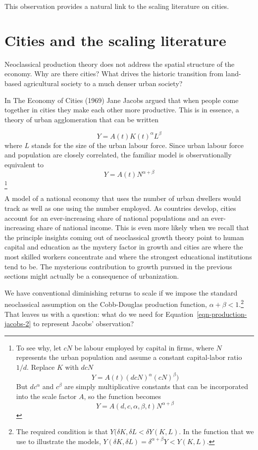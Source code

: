 This observation provides a natural link to the scaling literature on cities.


\section{Cities and the scaling literature}
Neoclassical production theory does not address the spatial structure of the economy. Why are there cities? What drives the historic transition from land-based agricultural society to a much denser urban society? 

In The Economy of Cities (1969) Jane Jacobs argued that when people come together in cities they make each other more productive. This is in essence, a theory of urban agglomeration that can be written

\begin{equation}
Y = A(t) K(t)^\alpha L^\beta 
\label{eqn-production-jacobs}
\end{equation}
where $L$ stands for the size of the urban labour force. Since urban labour force and population are closely correlated, the familiar model is observationally equivalent to
\begin{equation}
Y = A(t)N^{\alpha+\beta}
\label{eqn-production-jacobs-2}
\end{equation}
\footnote{ To see why, let  $cN$ be labour employed by capital in firms, where $N$ represents the urban population and assume a constant capital-labor ratio $1/d$. Replace $K$ with $dcN$
\[Y = A(t) (dcN)^\alpha (cN)^\beta) \]
But  $dc^\alpha$ and $c^\beta$ are simply multiplicative constants that can be incorporated into the scale factor $A$, so the function becomes 
\[Y = A(d, c,\alpha, \beta, t)N^{\alpha+\beta}\]
}

A model of a national economy that uses the number of urban dwellers would track as well as one using the number employed. As countries develop, cities account for an ever-increasing share of  national populations and an ever-increasing share of national income.  This is  even more likely when we recall that the principle insights coming out of neoclassical growth theory point to human capital and education as the mystery factor in growth and cities are where the most skilled workers concentrate and where the strongest educational institutions tend to be. The mysterious contribution to growth pursued in the previous sections might  actually be a consequence of urbanization.

We have conventional diminishing returns to scale  if we impose the standard neoclassical assumption on the Cobb-Douglas production function, 
$\alpha +\beta <1 $.\footnote{
The required condition is that 
$Y(\delta K,\delta L< \delta Y(K,L)$. 
In the function that we use to illustrate the models, 
$Y(\delta K,\delta L)= \delta^{\alpha +\beta}Y < Y(K,L)$.} 
That leaves us with a question: what do we need for Equation~\ref{eqn-production-jacobs-2} to represent Jacobs' observation?  


